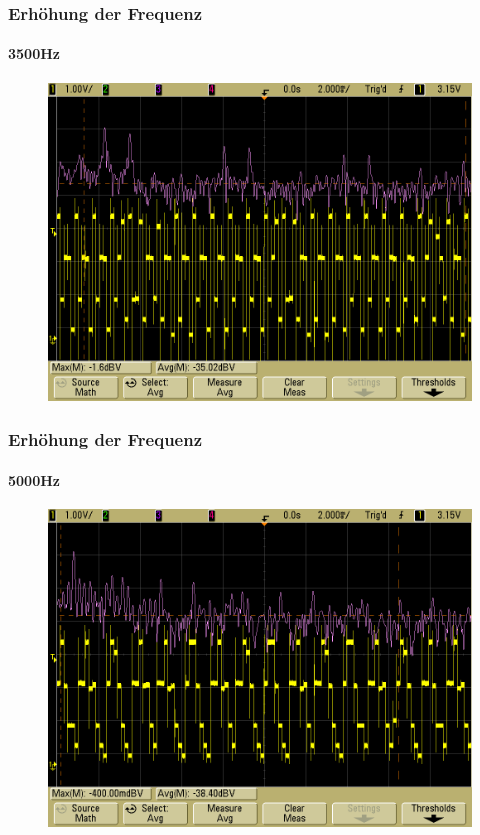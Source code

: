 \begin{frame}
    \frametitle{Erhöhung der Frequenz}
    \framesubtitle{3500Hz}
            \begin{figure}[H]
            \begin{center}
                    \includegraphics[scale=0.2]{./img/oszi/scope_27.png}
            \end{center}
            \end{figure}
\end{frame}
\begin{frame}
    \frametitle{Erhöhung der Frequenz}
    \framesubtitle{5000Hz}
            \begin{figure}[H]
            \begin{center}
                    \includegraphics[scale=0.2]{./img/oszi/scope_28.png}
            \end{center}
            \end{figure}
\end{frame}
